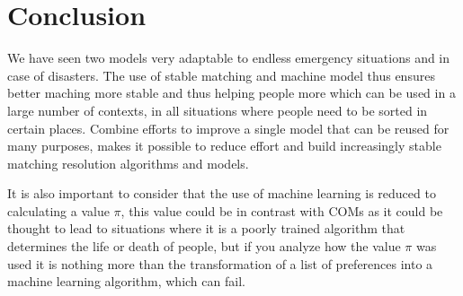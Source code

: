 \section{Conclusion}
We have seen two models very adaptable to endless emergency situations and in case of disasters.
The use of stable matching and machine model thus ensures better maching more stable and thus helping people more which can be used in a large number of contexts, in all situations where people need to be sorted in certain places.
Combine efforts to improve a single model that can be reused for many purposes, makes it possible to reduce effort and build increasingly stable matching resolution algorithms and models.

It is also important to consider that the use of machine learning is reduced to calculating a value \(\pi\), this value could be in contrast with COMs as it could be thought to lead to situations where it is a poorly trained algorithm that determines the life or death of people, but if you analyze how the value \(\pi\) was used it is nothing more than the transformation of a list of preferences into a machine learning algorithm, which can fail.
